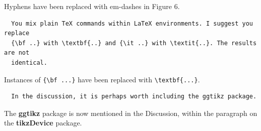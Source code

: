 \documentclass{article}
\begin{document}
Hyphens have been replaced with em-dashes in Figure 6.

\begin{verbatim}
  You mix plain TeX commands within LaTeX environments. I suggest you replace 
  {\bf ..} with \textbf{..} and {\it ..} with \textit{..}. The results are not 
  identical.
\end{verbatim}

Instances of \verb|{\bf ...}| have been replaced with \verb|\textbf{...}|.

\begin{verbatim}
  In the discussion, it is perhaps worth including the ggtikz package.
\end{verbatim}

The \textbf{ggtikz} package 
is now mentioned in the Discussion, within the paragraph on 
the \textbf{tikzDevice} package.
\end{document}
